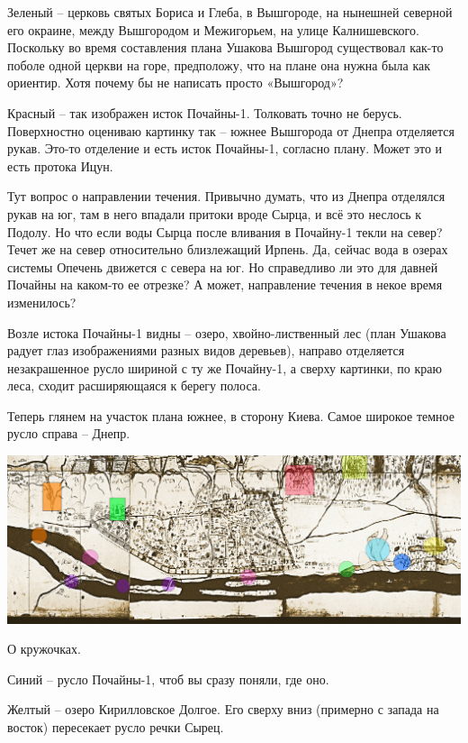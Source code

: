 Зеленый – церковь святых Бориса и Глеба, в Вышгороде, на нынешней северной его окраине, между Вышгородом и Межигорьем, на улице Калнишевского. Поскольку во время составления плана Ушакова Вышгород существовал как-то поболе одной церкви на горе, предположу, что на плане она нужна была как ориентир. Хотя почему бы не написать просто «Вышгород»?

Красный – так изображен исток Почайны-1. Толковать точно не берусь. Поверхностно оцениваю картинку так – южнее Вышгорода от Днепра отделяется рукав. Это-то отделение и есть исток Почайны-1, согласно плану. Может это и есть протока Ицун.

Тут вопрос о направлении течения. Привычно думать, что из Днепра отделялся рукав на юг, там в него впадали притоки вроде Сырца, и всё это неслось к Подолу. Но что если воды Сырца после вливания в Почайну-1 текли на север? Течет же на север относительно близлежащий Ирпень. Да, сейчас вода в озерах системы Опечень движется с севера на юг. Но справедливо ли это для давней Почайны на каком-то ее отрезке? А может, направление течения в некое время изменилось?

Возле истока Почайны-1 видны – озеро, хвойно-лист\-венный лес (план Ушакова радует глаз изображениями разных видов деревьев), направо отделяется незакрашенное русло шириной с ту же Почайну-1, а сверху картинки, по краю леса, сходит расширяющаяся к берегу полоса.

Теперь глянем на участок плана южнее, в сторону Киева. Самое широкое темное русло справа – Днепр.

\begin{center}
\includegraphics[width=\linewidth]{chast-colebanie-osnov/pochayna/po1695.jpg}
\end{center}

О кружочках.

Синий – русло Почайны-1, чтоб вы сразу поняли, где оно.

Желтый – озеро Кирилловское Долгое. Его сверху вниз (примерно с запада на восток) пересекает русло речки Сырец.

